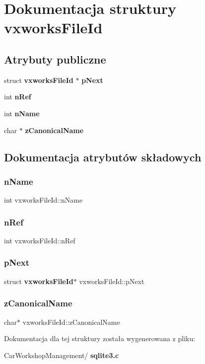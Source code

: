 \section{Dokumentacja struktury vxworks\+File\+Id}
\label{structvxworks_file_id}
\subsection*{Atrybuty publiczne}
\begin{DoxyCompactItemize}
\item 
struct \textbf{ vxworks\+File\+Id} $\ast$ \textbf{ p\+Next}
\item 
int \textbf{ n\+Ref}
\item 
int \textbf{ n\+Name}
\item 
char $\ast$ \textbf{ z\+Canonical\+Name}
\end{DoxyCompactItemize}


\subsection{Dokumentacja atrybutów składowych}
\mbox{\label{structvxworks_file_id_af7ed9a749d73b74b534bc06baf1abf6d}} 
\subsubsection{nName}
{\footnotesize\ttfamily int vxworks\+File\+Id\+::n\+Name}

\mbox{\label{structvxworks_file_id_a59dde49ee027786a06de8ad59b1d7883}} 
\subsubsection{nRef}
{\footnotesize\ttfamily int vxworks\+File\+Id\+::n\+Ref}

\mbox{\label{structvxworks_file_id_a1941104384e7aa1ad9d8574d091abe3a}} 
\subsubsection{pNext}
{\footnotesize\ttfamily struct \textbf{ vxworks\+File\+Id}$\ast$ vxworks\+File\+Id\+::p\+Next}

\mbox{\label{structvxworks_file_id_a032c9aaaa13ff100d9f3cd53926587fe}} 
\subsubsection{zCanonicalName}
{\footnotesize\ttfamily char$\ast$ vxworks\+File\+Id\+::z\+Canonical\+Name}



Dokumentacja dla tej struktury została wygenerowana z pliku\+:\begin{DoxyCompactItemize}
\item 
Car\+Workshop\+Management/\textbf{ sqlite3.\+c}\end{DoxyCompactItemize}
